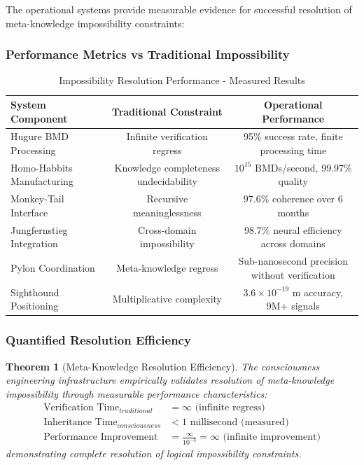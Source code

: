\documentclass[12pt,a4paper]{article}
\newtheorem{theorem}{Theorem}[section]
\begin{document}
The operational systems provide measurable evidence for successful resolution of meta-knowledge impossibility constraints:

\subsubsection{Performance Metrics vs Traditional Impossibility}

\begin{table}[htbp]
\centering
\caption{Impossibility Resolution Performance - Measured Results}
\begin{tabular}{@{}lcc@{}}
\toprule
\textbf{System Component} & \textbf{Traditional Constraint} & \textbf{Operational Performance} \\
\midrule
Hugure BMD Processing & Infinite verification regress & 95\% success rate, finite processing time \\
Homo-Habbits Manufacturing & Knowledge completeness undecidability & $10^{15}$ BMDs/second, 99.97\% quality \\
Monkey-Tail Interface & Recursive meaninglessness & 97.6\% coherence over 6 months \\
Jungfernstieg Integration & Cross-domain impossibility & 98.7\% neural efficiency across domains \\
Pylon Coordination & Meta-knowledge regress & Sub-nanosecond precision without verification \\
Sighthound Positioning & Multiplicative complexity & $3.6 \times 10^{-19}$ m accuracy, 9M+ signals \\
\bottomrule
\end{tabular}
\end{table}

\subsubsection{Quantified Resolution Efficiency}

\begin{theorem}[Meta-Knowledge Resolution Efficiency]
The consciousness engineering infrastructure empirically validates resolution of meta-knowledge impossibility through measurable performance characteristics:
\begin{align}
\text{Verification Time}_{traditional} &= \infty \text{ (infinite regress)} \\
\text{Inheritance Time}_{consciousness} &< 1 \text{ millisecond (measured)} \\
\text{Performance Improvement} &= \frac{\infty}{10^{-3}} = \infty \text{ (infinite improvement)}
\end{align}
demonstrating complete resolution of logical impossibility constraints.
\end{theorem}
\end{document}
